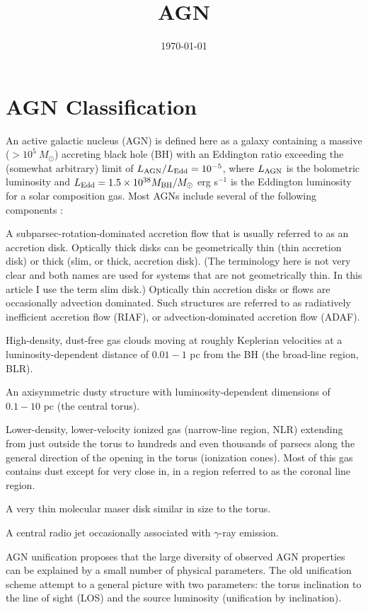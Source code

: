 \documentclass[12pt,a4paper]{article}
\title{AGN}
\author{}
\date{\today}
\begin{document}
\maketitle
\section{AGN Classification}
\cite{2015ARA&A..53..365N} An active galactic nucleus (AGN) is defined here as a galaxy containing a massive ($> 10^5~ M_{\odot}$) accreting black hole (BH) with an Eddington ratio exceeding the (somewhat arbitrary) limit of $L_{\rm AGN}/L_{\rm Edd} = 10^{-5}$, where $L_{\rm AGN}$ is the bolometric luminosity and $L_{\rm Edd} = 1.5\times 10^{38} M_{\rm BH} /M_{\odot}$ erg s$^{-1}$ is the Eddington luminosity for a solar composition gas. Most AGNs include several of the following components :

A subparsec-rotation-dominated accretion flow that is usually referred to as an accretion disk. Optically thick disks can be geometrically thin (thin accretion disk) or thick (slim, or thick, accretion disk). (The terminology here is not very clear and both names are used for systems that are not geometrically thin. In this article I use the term slim disk.) Optically thin accretion disks or flows are occasionally advection dominated. Such structures are referred to as radiatively inefficient accretion flow (RIAF), or advection-dominated accretion flow (ADAF).

High-density, dust-free gas clouds moving at roughly Keplerian velocities at a luminosity-dependent distance of $0.01-1$ pc from the BH (the broad-line region, BLR).

An axisymmetric dusty structure with luminosity-dependent dimensions of $0.1-10$ pc (the central torus).

Lower-density, lower-velocity ionized gas (narrow-line region, NLR) extending from just outside the torus to hundreds and even thousands of parsecs along the general direction of the opening in the torus (ionization cones). Most of this gas contains dust except for very close in, in a region referred to as the coronal line region. 

A very thin molecular maser disk similar in size to the torus.

A central radio jet occasionally associated with $\gamma$-ray emission.

AGN unification proposes that the large diversity of observed AGN properties can be explained by a small number of physical parameters. The old unification scheme attempt to a general picture with two parameters: the torus inclination to the line of sight (LOS) and the source luminosity (unification by inclination). 
\end{document}
